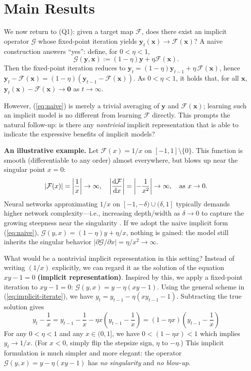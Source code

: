 \documentclass{amsart} %
\def\eqref#1{equation~\ref{#1}}
\def\vzero{{\bm{0}}}
\def\vx{{\bm{x}}}
\def\vy{{\bm{y}}}
\def\cF{{\mathcal{F}}}
\def\cG{{\mathcal{G}}}
\theoremstyle{definition}
\theoremstyle{remark}
\renewcommand{\eqref}[1]{\textup{(\ref{#1})}}
\begin{document}
\section{Main Results}
\label{sec:main-results}


We now return to (Q1): given a target map \(\cF\), does there exist an implicit operator \(\cG\) whose fixed-point iteration yields $\vy_t(\vx)\to\cF(\vx)$? A naive construction answers “yes”: define, for \(0<\eta<1\),
\begin{equation}
\label{eq:naive}
\cG(\vy,\vx) := (1-\eta) \vy + \eta \cF(\vx).
\end{equation}
Then the fixed-point iteration reduces to \(\vy_t=(1-\eta)\vy_{t-1}+\eta\,\cF(\vx)\), hence \(\vy_t - \cF(\vx)= (1-\eta) (\vy_{t-1}-\cF(\vx))\). As \(0<\eta<1\), it holds that, for all \(\vx\), \(\vy_t(\vx) - \cF(\vx) \to \vzero \) as \(t\to\infty\).



However, \eqref{eq:naive} is merely a trivial averaging of \(\vy\) and \(\cF(\vx)\); learning such an implicit model is no different from learning \(\cF\) directly. This prompts the natural follow-up: is there any \emph{nontrivial} implicit representation that is able to indicate the expressive benefits of implicit models?



\textbf{An illustrative example.} Let \(\cF(x)=1/x\) on \([-1,1]\setminus\{0\}\). This function is smooth (differentiable to any order) almost everywhere, but blows up near the singular point $x=0$: 
\[ |\cF(x)|= \left| \frac{1}{x} \right| \to \infty,\quad \left|\frac{\mathrm{d}\cF}{\mathrm{d}x}\right|=\left|-\frac{1}{x^2}\right| \to \infty, \quad \textup{as }x \to 0.
\]
Neural networks approximating $1/x$ on $[-1,-\delta)\cup(\delta,1]$ typically demands higher network complexity—i.e., increasing depth/width as $\delta \to 0$ to capture the growing steepness near the singularity \cite{telgarsky2017neural}.
If we adopt the naive implicit form \eqref{eq:naive}, \(\cG(y,x)=(1-\eta)y+\eta/x\), nothing is gained: the model still inherits the singular behavior \(|\partial\cG/\partial x|= \eta/x^2\to\infty\).



What would be a nontrivial implicit representation in this setting? Instead of writing $(1/x)$ explicitly, we can regard it as the solution of the equation $xy-1=0$ \textbf{(implicit representation)}. Inspired by this, we apply a fixed-point iteration to $xy-1=0$: $\cG(y,x)=y-\eta(xy-1)$. Using the general scheme in \eqref{eq:implicit-iterate}, we have $y_t = y_{t-1} - \eta (x y_{t-1}-1)$. Subtracting the true solution gives
\[ y_t -\frac{1}{x} = y_{t-1} - \frac{1}{x} - \eta x \left( y_{t-1} - \frac{1}{x} \right) = \left(1-\eta x\right)\left( y_{t-1} - \frac{1}{x} \right)
\]
For any \(0<\eta<1\) and any $x \in (0,1]$, we have $0 < (1-\eta x) < 1$ which implies $y_t \to 1/x$. (For $x<0$, simply flip the stepsize sign, $\eta$ to $-\eta$.) This implicit formulation is much simpler and more elegant: the operator $\cG(y,x)=y-\eta(xy-1)$ has \textit{no singularity} and \textit{no blow-up}.
\end{document}
